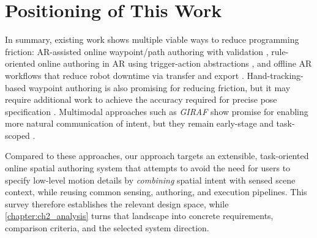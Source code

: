 \section{Positioning of This Work}

In summary, existing work shows multiple viable ways to reduce programming friction: AR-assisted online waypoint/path authoring with validation \cite{Ong2020}, rule-oriented online authoring in AR using trigger-action abstractions \cite{Ikeda2024}, and offline AR workflows that reduce robot downtime via transfer and export \cite{Muller2024}. Hand-tracking-based waypoint authoring is also promising for reducing friction, but it may require additional work to achieve the accuracy required for precise pose specification \cite{Vysocky2023}. Multimodal approaches such as \emph{GIRAF} show promise for enabling more natural communication of intent, but they remain early-stage and task-scoped \cite{Lin2023}.

Compared to these approaches, our approach targets an extensible, task-oriented online spatial authoring system that attempts to avoid the need for users to specify low-level motion details by \emph{combining} spatial intent with sensed scene context, while reusing common sensing, authoring, and execution pipelines. This survey therefore establishes the relevant design space, while \autoref{chapter:ch2_analysis} turns that landscape into concrete requirements, comparison criteria, and the selected system direction.
